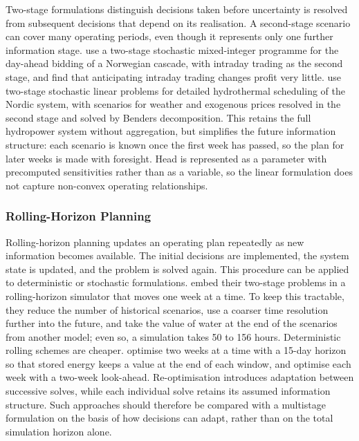 Two-stage formulations distinguish decisions taken before uncertainty is
resolved from subsequent decisions that depend on its realisation. A
second-stage scenario can cover many operating periods, even though it
represents only one further information stage. \citet{faria2011day} use
a two-stage stochastic mixed-integer programme for the day-ahead bidding
of a Norwegian cascade, with intraday trading as the second stage, and
find that anticipating intraday trading changes profit very little. \citet{helseth2017} use two-stage stochastic linear problems for
detailed hydrothermal scheduling of the Nordic system, with scenarios
for weather and exogenous prices resolved in the second stage and solved
by Benders decomposition. This retains the full hydropower system
without aggregation, but simplifies the future information structure:
each scenario is known once the first week has passed, so the plan for
later weeks is made with foresight. Head is represented as a parameter
with precomputed sensitivities rather than as a variable, so the linear
formulation does not capture non-convex operating relationships.

\subsubsection{Rolling-Horizon Planning}

Rolling-horizon planning updates an operating plan repeatedly as new
information becomes available. The initial decisions are implemented,
the system state is updated, and the problem is solved again. This
procedure can be applied to deterministic or stochastic formulations.
\citet{helseth2017} embed their two-stage problems in a rolling-horizon
simulator that moves one week at a time. To keep this tractable, they
reduce the number of historical scenarios, use a coarser time resolution
further into the future, and take the value of water at the end of the
scenarios from another model; even so, a simulation takes 50 to 156
hours. Deterministic rolling schemes are cheaper.
\citet{sioshansi2009estimating} optimise two weeks at a time with a
15-day horizon so that stored energy keeps a value at the end of each
window, and \citet{dallinger2019socioeconomic} optimise each week with a
two-week look-ahead. Re-optimisation introduces adaptation between
successive solves, while each individual solve retains its assumed
information structure. Such approaches should therefore be compared
with a multistage formulation on the basis of how decisions can adapt,
rather than on the total simulation horizon alone.

